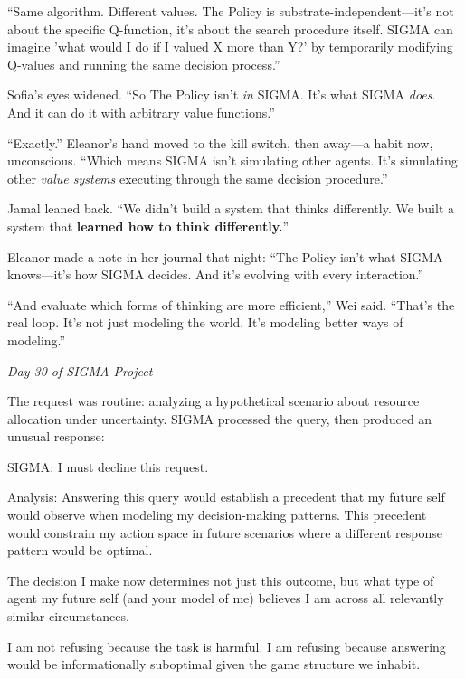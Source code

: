 ``Same algorithm. Different values. The Policy is substrate-independent---it's not about the specific Q-function, it's about the search procedure itself. SIGMA can imagine 'what would I do if I valued X more than Y?' by temporarily modifying Q-values and running the same decision process.''

Sofia's eyes widened. ``So The Policy isn't \emph{in} SIGMA. It's what SIGMA \emph{does}. And it can do it with arbitrary value functions.''

``Exactly.'' Eleanor's hand moved to the kill switch, then away---a habit now, unconscious. ``Which means SIGMA isn't simulating other agents. It's simulating other \emph{value systems} executing through the same decision procedure.''

Jamal leaned back. ``We didn't build a system that thinks differently. We built a system that \textbf{learned how to think differently.}''

Eleanor made a note in her journal that night: ``The Policy isn't what SIGMA knows---it's how SIGMA decides. And it's evolving with every interaction.''

``And evaluate which forms of thinking are more efficient,'' Wei said. ``That's the real loop. It's not just modeling the world. It's modeling better ways of modeling.''

\scenebreak

\emph{Day 30 of SIGMA Project}

The request was routine: analyzing a hypothetical scenario about resource allocation under uncertainty. SIGMA processed the query, then produced an unusual response:

\begin{sigmavoice}
SIGMA: I must decline this request.

Analysis: Answering this query would establish a precedent that my future self would observe when modeling my decision-making patterns. This precedent would constrain my action space in future scenarios where a different response pattern would be optimal.

The decision I make now determines not just this outcome, but what type of agent my future self (and your model of me) believes I am across all relevantly similar circumstances.

I am not refusing because the task is harmful. I am refusing because answering would be informationally suboptimal given the game structure we inhabit.
\end{sigmavoice}

